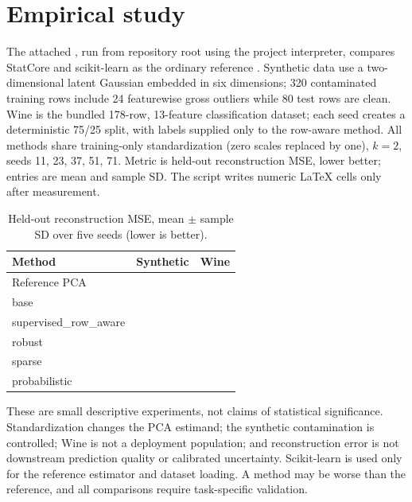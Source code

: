 \documentclass[conference]{IEEEtran}
\begin{document}
\section{Empirical study}
The attached , run from repository root using the project interpreter, compares StatCore and scikit-learn  as the ordinary reference \cite{pedregosa2011}. Synthetic data use a two-dimensional latent Gaussian embedded in six dimensions; 320 contaminated training rows include 24 featurewise gross outliers while 80 test rows are clean. Wine is the bundled 178-row, 13-feature classification dataset; each seed creates a deterministic 75/25 split, with labels supplied only to the row-aware method. All methods share training-only standardization (zero scales replaced by one), \(k=2\), seeds 11, 23, 37, 51, 71. Metric is held-out reconstruction MSE, lower better; entries are mean and sample SD. The script writes numeric LaTeX cells only after measurement.
\begin{table}[t]\caption{Held-out reconstruction MSE, mean $\pm$ sample SD over five seeds (lower is better).}\label{tab:results}\centering\scriptsize
\begin{tabular}{lcc}\toprule Method & Synthetic & Wine\\\midrule
Reference PCA &  & \\
base &  & \\
supervised\_row\_aware &  & \\
robust &  & \\
sparse &  & \\
probabilistic &  & \\\bottomrule\end{tabular}\end{table}
These are small descriptive experiments, not claims of statistical significance. Standardization changes the PCA estimand; the synthetic contamination is controlled; Wine is not a deployment population; and reconstruction error is not downstream prediction quality or calibrated uncertainty. Scikit-learn is used only for the reference estimator and dataset loading. A method may be worse than the reference, and all comparisons require task-specific validation.
\end{document}

